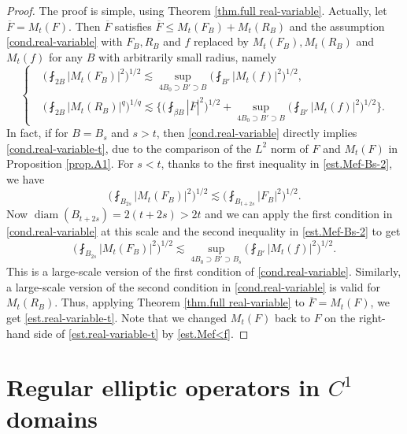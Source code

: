 \documentclass[reqno,12pt]{amsart} %
\theoremstyle{definition}
\theoremstyle{remark}
\numberwithin{equation}{section}
\DeclareMathOperator{\diam}{diam}
\begin{document}
\begin{proof}
    The proof is simple, using Theorem \ref{thm.full real-variable}. Actually, let $\overline{F} = M_t(F)$. Then $\overline{F}$ satisfies $\overline{F} \le M_t(F_B) + M_t(R_B)$ and the assumption \eqref{cond.real-variable} with $F_B, R_B$ and $f$ replaced by $M_t(F_B), M_t(R_B)$ and $M_t(f)$ for any $B$ with arbitrarily small radius, namely
    \begin{equation}\label{cond.real-variable-t}
\left\{
\begin{aligned}
& \bigg( \fint_{2B} |M_t(F_B)|^2 \bigg)^{1/2} 
\lesssim \sup_{4B_0 \supset B' \supset B} \bigg( \fint_{B'} |M_t(f)|^2  \bigg)^{1/2},\\
& \bigg( \fint_{2B} |M_t(R_B)|^q \bigg)^{1/q} 
\lesssim \bigg\{ 
\bigg( \fint_{\beta B} |\overline{F}|^2  \bigg)^{1/2} 
+ \sup_{4B_0 \supset B' \supset B} \bigg(  \fint_{B'} |M_t(f)|^2 \bigg)^{1/2} 
\bigg\}.
\end{aligned}
\right.
\end{equation}
    In fact, if for $B = B_s$ and $s>t$, then \eqref{cond.real-variable} directly implies \eqref{cond.real-variable-t}, due to the comparison of the $L^2$ norm of $F$ and $M_t(F)$ in Proposition \ref{prop.A1}. For $s<t$, thanks to the first inequality in \eqref{est.Mef-Bs-2}, we have
    \begin{equation}
        \bigg( \fint_{B_{2s}} |M_t(F_B)|^2 \bigg)^{1/2} \lesssim \bigg( \fint_{B_{t+2s}} |F_B|^2 \bigg)^{1/2}.
    \end{equation}
    Now $\diam(B_{t+2s}) = 2(t+2s) > 2t$ and we can apply the first condition in \eqref{cond.real-variable} at this scale and the second inequality in \eqref{est.Mef-Bs-2} to get
    \begin{equation}
        \bigg( \fint_{B_{2s}} |M_t(F_B)|^2 \bigg)^{1/2} \lesssim \sup_{4B_0 \supset B' \supset B_s} \bigg( \fint_{B'} |M_t(f)|^2  \bigg)^{1/2}.
    \end{equation}
    This is a large-scale version of the first condition of \eqref{cond.real-variable}.
    Similarly, a large-scale version of the second condition in \eqref{cond.real-variable} is valid for $M_t(R_B)$. Thus, applying Theorem \ref{thm.full real-variable} to $\overline{F} = M_t(F)$, we get \eqref{est.real-variable-t}. Note that we changed $M_t(F)$ back to $F$ on the right-hand side of \eqref{est.real-variable-t} by \eqref{est.Mef<f}.
\end{proof}

\section{Regular elliptic operators in $C^1$ domains}\label{A-D}
\end{document}
